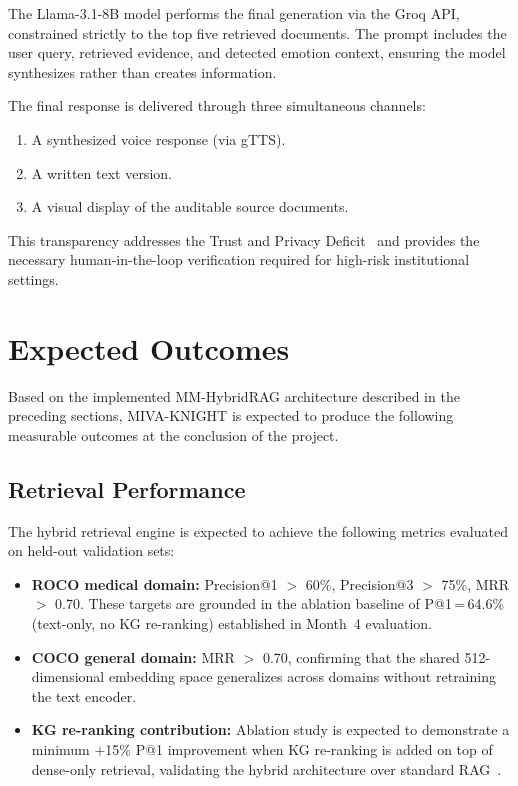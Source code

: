 \documentclass[12pt, a4paper]{article}
\begin{document}
The Llama-3.1-8B model performs the final generation via the Groq API,
constrained strictly to the top five retrieved documents. The prompt includes
the user query, retrieved evidence, and detected emotion context, ensuring the
model synthesizes rather than creates information.

The final response is delivered through three simultaneous channels:
\begin{enumerate}[leftmargin=1.5em]
  \item A synthesized voice response (via gTTS).
  \item A written text version.
  \item A visual display of the auditable source documents.
\end{enumerate}

This transparency addresses the Trust and Privacy
Deficit~\cite{pan2024unifying} and provides the necessary human-in-the-loop
verification required for high-risk institutional settings.

\section{Expected Outcomes}

Based on the implemented MM-HybridRAG architecture described in the preceding
sections, MIVA-KNIGHT is expected to produce the following measurable outcomes
at the conclusion of the project.

\subsection{Retrieval Performance}

The hybrid retrieval engine is expected to achieve the following metrics
evaluated on held-out validation sets:

\begin{itemize}[leftmargin=1.5em]
  \item \textbf{ROCO medical domain:} Precision@1 $>$ 60\%, Precision@3 $>$
    75\%, MRR $>$ 0.70. These targets are grounded in the ablation baseline of
    P@1\,=\,64.6\% (text-only, no KG re-ranking) established in Month~4
    evaluation.
  \item \textbf{COCO general domain:} MRR $>$ 0.70, confirming that the shared
    512-dimensional embedding space generalizes across domains without
    retraining the text encoder.
  \item \textbf{KG re-ranking contribution:} Ablation study is expected to
    demonstrate a minimum $+$15\% P@1 improvement when KG re-ranking is added
    on top of dense-only retrieval, validating the hybrid architecture over
    standard RAG~\cite{sarmah2024hybridrag}.
\end{itemize}
\end{document}
